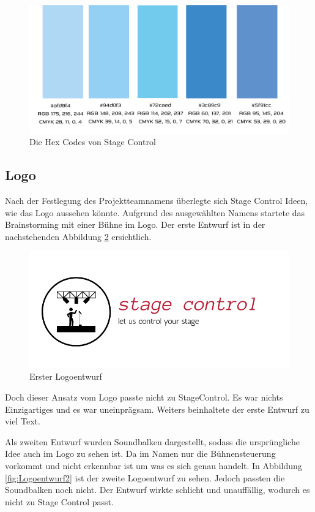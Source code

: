 \begin{figure}[H]
	\centering
	\includegraphics[width=0.7\linewidth]{images/Hexcode.png}
	\caption[Die Hex Codes von Stage Control]{Die Hex Codes von Stage Control}
	\label{fig:Hexcode}
\end{figure}


\subsection{Logo}
Nach der Festlegung des Projektteamnamens überlegte sich Stage Control Ideen, wie das Logo aussehen könnte. Aufgrund des ausgewählten Namens startete das Brainstorming mit einer Bühne im Logo. Der erste Entwurf ist in der nachstehenden Abbildung \ref{fig:Logoentwurf1} ersichtlich. 

\begin{figure}[H]
	\centering
	\includegraphics[width=0.5\linewidth]{images/Logoentwurf1.png}
	\caption[Erster Logoentwurf]{Erster Logoentwurf}
	\label{fig:Logoentwurf1}
\end{figure}

Doch dieser Ansatz vom Logo passte nicht zu StageControl. Es war nichts Einzigartiges und es war uneinprägsam. Weiters beinhaltete der erste Entwurf zu viel Text. 

Als zweiten Entwurf wurden Soundbalken dargestellt, sodass die ursprüngliche Idee auch im Logo zu sehen ist. Da im Namen nur die Bühnensteuerung vorkommt und nicht erkennbar ist um was es sich genau handelt. In Abbildung \ref{fig:Logoentwurf2} ist der zweite Logoentwurf zu sehen. Jedoch passten die Soundbalken noch nicht. Der Entwurf wirkte schlicht und unauffällig, wodurch es nicht zu Stage Control passt. 

